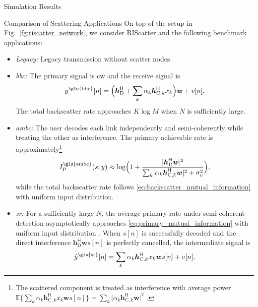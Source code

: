 \documentclass[journal]{IEEEtran}
\begin{document}
\begin{section}{Simulation Results}
	\begin{subsection}{Comparison of Scattering Applications}
		On top of the setup in Fig.~\ref{fg:riscatter_network}, we consider RIScatter and the following benchmark applications:
		\begin{itemize}
			\item \emph{Legacy:} Legacy transmission without scatter nodes.
			\item \emph{\gls{bbc}:} The primary signal is \gls{cw} and the receive signal is
			\begin{equation}
				y^{\text{\gls{bbc}}}[n] = \Bigl(\boldsymbol{h}_{\text{D}}^\mathsf{H} + \sum_{k} \alpha_k \boldsymbol{h}_{\text{C},k}^\mathsf{H} x_k\Bigr) \boldsymbol{w} + v[n].
			\end{equation}
			The total backscatter rate approaches $K \log M$ when $N$ is sufficiently large.
			\item \emph{\gls{ambc}:} The user decodes each link independently and semi-coherently while treating the other as interference.
			The primary achievable rate is approximately\footnote{The scattered component is treated as interference with average power $\mathbb{E}\bigl\{\sum_{k} \alpha_k \boldsymbol{h}_{\text{C},k}^\mathsf{H} x_k \boldsymbol{w}s[n]\bigr\} = \sum_{k} \lvert \alpha_k \boldsymbol{h}_{\text{C},k}^\mathsf{H} \boldsymbol{w} \rvert^2$ \cite{Long2020a}.\label{fn:ambc}}
			\begin{equation}
				I_{\text{P}}^{\text{\gls{ambc}}}(s;y) \approx \log \Bigl(1 + \frac{\lvert\boldsymbol{h}_{\text{D}}^\mathsf{H}\boldsymbol{w}\rvert^2}{\sum_{k}\lvert \alpha_k \boldsymbol{h}_{\text{C},k}^\mathsf{H} \boldsymbol{w}\rvert^2+\sigma_v^2}\Bigr),
			\end{equation}
			while the total backscatter rate follows \eqref{eq:backscatter_mutual_information} with uniform input distribution.
			\item \emph{\gls{sr}:} For a sufficiently large $N$, the average primary rate under semi-coherent detection asymptotically approaches \eqref{eq:primary_mutual_information} with uniform input distribution \cite{Long2020a}.
			When $s[n]$ is successfully decoded and the direct interference $\boldsymbol{h}_{\text{D}}^\mathsf{H} \boldsymbol{w} s[n]$ is perfectly cancelled, the intermediate signal is
			\begin{equation}
				\hat{y}^{\text{\gls{sr}}}[n] = \sum_{k} \alpha_k \boldsymbol{h}_{\text{C},k}^\mathsf{H} x_k \boldsymbol{w} s[n] + v[n].
				\label{eq:intermediate_signal}
			\end{equation}

\end{itemize}
\end{subsection}
\end{section}
\end{document}
